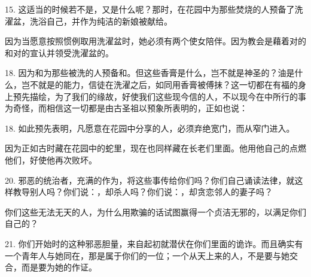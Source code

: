 15. 这适当的时候若不是，又是什么呢？那时，在花园中为那些焚烧的人预备了洗濯盆，洗浴自己，并作为纯洁的新娘被献给。\par

因为当愿意按照惯例取用洗濯盆时，她必须有两个使女陪伴。因为教会是藉着对的和对的宣认并领受洗濯盆的。\par

18. 因为和为那些被洗的人预备和。但这些香膏是什么，岂不就是神圣的？油是什么，岂不就是的能力，信徒在洗濯之后，如同用香膏被傅抹？这一切都在有福的身上预先描绘，为了我们的缘故，好使我们这些现今信的人，不以现今在中所行的事为奇怪，而相信这一切都是由古圣祖以预象所表明的，正如也说：\par

18. 如此预先表明，凡愿意在花园中分享的人，必须弃绝宽门，而从窄门进入。\par

因为正如古时藏在花园中的蛇里，现在也同样藏在长老们里面。他用他自己的点燃他们，好使他再次败坏。\par

20. 邪恶的统治者，充满的作为，将这些事传给你们吗？你们自己诵读法律，就这样教导别人吗？你们说：，却杀人吗？你们说：，却贪恋邻人的妻子吗？\par

你们这些无法无天的人，为什么用欺骗的话试图赢得一个贞洁无邪的，以满足你们自己的？\par

21. 你们开始时的这种邪恶胆量，来自起初就潜伏在你们里面的诡诈。而且确实有一个青年人与她同在，那是属于你们的一位；一个从天上来的人，不是要与她交合，而是要为她的作证。\par


